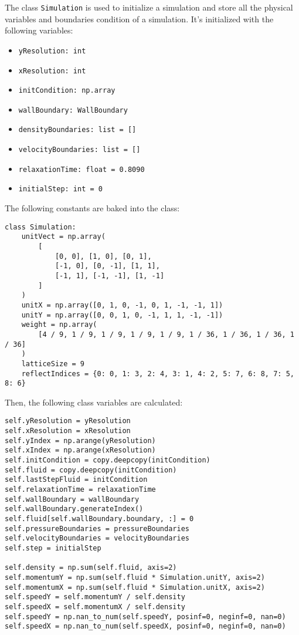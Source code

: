 The class \texttt{Simulation} is used to initialize a simulation and store all the physical variables and boundaries condition of a simulation. It's initialized with the following variables:
\begin{itemize}[noitemsep]
	\item \texttt{yResolution: int}
	\item \texttt{xResolution: int}
	\item \texttt{initCondition: np.array}
	\item \texttt{wallBoundary: WallBoundary}
	\item \texttt{densityBoundaries: list = []}
	\item \texttt{velocityBoundaries: list = []}
	\item \texttt{relaxationTime: float = 0.8090}
	\item \texttt{initialStep: int = 0}
\end{itemize}
The following constants are baked into the class:
\begin{verbatim}
class Simulation:
    unitVect = np.array(
        [
            [0, 0], [1, 0], [0, 1],
            [-1, 0], [0, -1], [1, 1],
            [-1, 1], [-1, -1], [1, -1]
        ]
    )
    unitX = np.array([0, 1, 0, -1, 0, 1, -1, -1, 1])
    unitY = np.array([0, 0, 1, 0, -1, 1, 1, -1, -1])
    weight = np.array(
        [4 / 9, 1 / 9, 1 / 9, 1 / 9, 1 / 9, 1 / 36, 1 / 36, 1 / 36, 1 / 36]
    )
    latticeSize = 9
    reflectIndices = {0: 0, 1: 3, 2: 4, 3: 1, 4: 2, 5: 7, 6: 8, 7: 5, 8: 6}
\end{verbatim}
Then, the following class variables are calculated:
\begin{verbatim}
self.yResolution = yResolution
self.xResolution = xResolution
self.yIndex = np.arange(yResolution)
self.xIndex = np.arange(xResolution)
self.initCondition = copy.deepcopy(initCondition)
self.fluid = copy.deepcopy(initCondition)
self.lastStepFluid = initCondition
self.relaxationTime = relaxationTime
self.wallBoundary = wallBoundary
self.wallBoundary.generateIndex()
self.fluid[self.wallBoundary.boundary, :] = 0
self.pressureBoundaries = pressureBoundaries
self.velocityBoundaries = velocityBoundaries
self.step = initialStep

self.density = np.sum(self.fluid, axis=2)
self.momentumY = np.sum(self.fluid * Simulation.unitY, axis=2)
self.momentumX = np.sum(self.fluid * Simulation.unitX, axis=2)
self.speedY = self.momentumY / self.density
self.speedX = self.momentumX / self.density
self.speedY = np.nan_to_num(self.speedY, posinf=0, neginf=0, nan=0)
self.speedX = np.nan_to_num(self.speedX, posinf=0, neginf=0, nan=0)
\end{verbatim}


